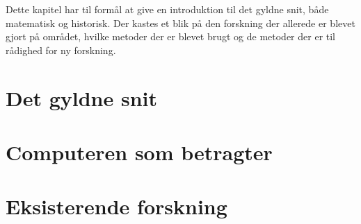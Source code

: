 \textsf{
Dette kapitel har til formål at give en introduktion til det gyldne snit,
både matematisk og historisk. Der kastes et blik på den forskning der
allerede er blevet gjort på området, hvilke metoder der er blevet brugt
og de metoder der er til rådighed for ny forskning.
}

\section{Det gyldne snit\label{section_gyldne_snit}}


\section{Computeren som betragter\label{section_computer_betragter}}


\section{Eksisterende forskning\label{section_forskning}}


